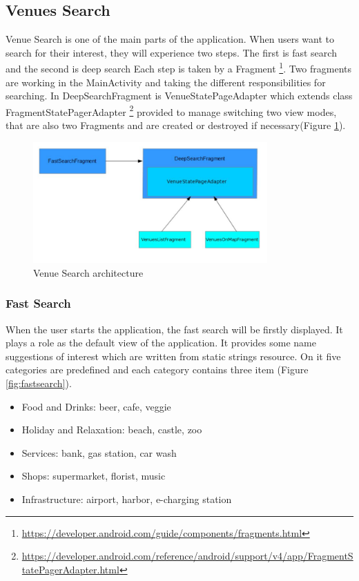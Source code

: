\subsection{Venues Search}
Venue Search is one of the main parts of the application. When users want to search for their interest, they will experience two steps. The first is fast search and the second is deep search
Each step is taken by a Fragment \footnote{\url{https://developer.android.com/guide/components/fragments.html}}. Two fragments are working in the MainActivity and taking the different responsibilities for searching. In DeepSearchFragment is VenueStatePageAdapter which extends class FragmentStatePagerAdapter  \footnote{\url{https://developer.android.com/reference/android/support/v4/app/FragmentStatePagerAdapter.html}} provided  to manage switching two view modes, that are also two Fragments and are created or destroyed if necessary(Figure \ref{fig:venue_search}).
\begin{figure}[htbp]
	\includegraphics[width=0.8\textwidth]{images/venue_search.jpg}
	\centering
	\caption{Venue Search architecture}\label{fig:venue_search}
\end{figure}
\subsubsection{Fast Search}
When the user starts the application, the fast search will be firstly displayed. It plays a role as the default view of the application. It provides some name suggestions of interest which are written from static strings resource. On it five categories are predefined and each category contains three item  (Figure \ref{fig:fastsearch}).
\begin{itemize}
	 \item Food and Drinks: beer, cafe, veggie
	 \item Holiday and Relaxation: beach, castle, zoo
	 \item Services: bank, gas station, car wash
	 \item Shops: supermarket, florist, music
	 \item Infrastructure: airport, harbor, e-charging station
\end{itemize}

